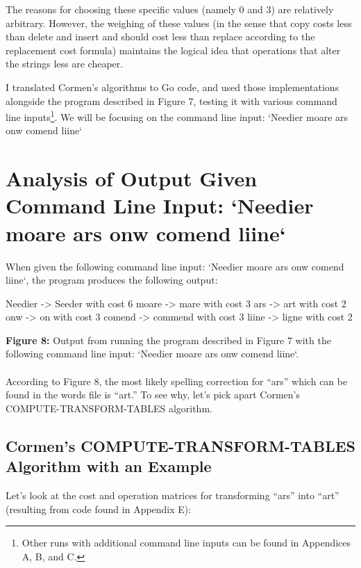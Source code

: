 \documentclass[12pt,letterpaper]{article}
\begin{document}
The reasons for choosing these specific values (namely 0 and 3) are relatively arbitrary. However, the weighing of these values (in the sense that copy costs less than delete and insert and should cost less than replace according to the replacement cost formula) maintains the logical idea that operations that alter the strings less are cheaper.

I translated Cormen’s algorithms to Go code, and used those implementations alongside the program described in Figure 7, testing it with various command line inputs\footnote[3]{Other runs with additional command line inputs can be found in Appendices A, B, and C.}. We will be focusing on the command line input: `Needier moare ars onw comend liine`

\section{Analysis of Output Given Command Line Input: `Needier moare ars onw comend liine`}
When given the following command line input:  `Needier moare ars onw comend liine`, the program produces the following output:

\begin{small}
    \begin{spverbatim}
    Needier -> Seeder with cost 6
    moare -> mare with cost 3
    ars -> art with cost 2
    onw -> on with cost 3
    comend -> commend with cost 3
    liine -> ligne with cost 2
    \end{spverbatim}
\end{small}

\begin{footnotesize}
    \textbf{Figure 8:} Output from running the program described in Figure 7 with the following command line input: `Needier moare ars onw comend liine`.
\end{footnotesize}
\paragraph{}

According to Figure 8, the most likely spelling correction for “ars” which can be found in the words file is “art.” To see why, let’s pick apart Cormen’s COMPUTE-TRANSFORM-TABLES algorithm.

\subsection{Cormen’s COMPUTE-TRANSFORM-TABLES Algorithm with an Example}
Let’s look at the cost and operation matrices for transforming “ars” into “art” (resulting from code found in Appendix E):
\end{document}
